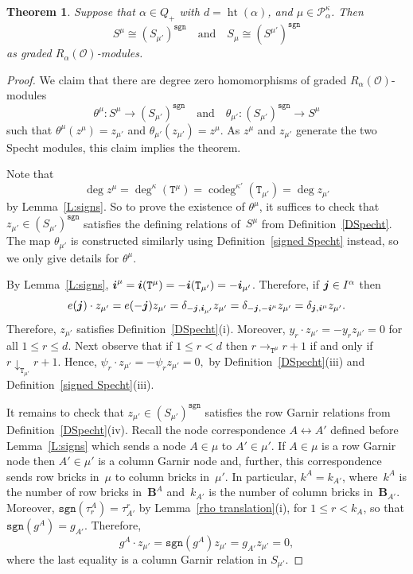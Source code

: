\documentclass[twoside,11pt,reqno]{amsart}
\numberwithin{equation}{section}
\newtheorem{Theorem}[equation]{Theorem}
\theoremstyle{definition}  %
\def\bi{\text{\boldmath$i$}}
\def\bj{\text{\boldmath$j$}}
\def\sgn{\mathtt{sgn}}
\newcommand{\0}{{\bar 0}}
\newcommand{\1}{{\bar 1}}
\newcommand{\al}{\alpha}
\def\Belt{\mathbf{B}}
\newcommand\Par[1][]{{\mathscr P}^{\kappa#1}}
\def\T{{\mathtt T}}
\def\codeg{\operatorname{codeg}}
\def\height{{\operatorname{ht}}}
\renewcommand\O{\mathcal O}
\begin{document}
\begin{Theorem}\label{TSignDualSpecht}
  Suppose that $\al\in Q_+$ with $d=\height(\al)$, and $\mu\in\Par_\alpha$. Then
  $$S^\mu\cong(S_{\mu'})^\sgn \quad\text{and}\quad S_\mu\cong(S^{\mu'})^\sgn$$ 
  as graded $R_\al(\O)$-modules.
\end{Theorem}

\begin{proof}
  We claim that there are degree zero homomorphisms  of graded  $R_\alpha(\O)$-modules
  $$ \theta^\mu:S^\mu\longrightarrow(S_{\mu'})^\sgn\quad\text{and}\quad
     \theta_{\mu'}:(S_{\mu'})^\sgn\longrightarrow S^\mu$$
  such that $\theta^\mu(z^\mu)=z_{\mu'}$ and $\theta_{\mu'}(z_{\mu'})=z^\mu$. As $z^\mu$
  and $z_{\mu'}$ generate the two Specht modules, this claim implies the theorem.  %
  
Note that  
$$\deg z^\mu=\deg^\kappa(\T^\mu)=\codeg^{\kappa'}(\T_{\mu'})=\deg z_{\mu'}$$ 
  by Lemma~\ref{L:signs}. 
 So to prove the existence of $\theta^\mu$, it suffices to check that $z_{\mu'}\in (S_{\mu'})^\sgn$ satisfies the defining relations of~$S^\mu$ from Definition~\ref{DSpecht}. The map $\theta_{\mu'}$ is constructed similarly using Definition~\ref{signed Specht} instead, so we only give details for $\theta^\mu$. 

  By Lemma~\ref{L:signs}, $\bi^\mu=\bi(\T^\mu)=-\bi(\T_{\mu'})=-\bi_{\mu'}$.  Therefore, if
  $\bj\in I^\al$ then
  $$e(\bj)\cdot z_{\mu'}=e(-\bj)z_{\mu'}=\delta_{-\bj,\bi_{\mu'}}z_{\mu'}=\delta_{-\bj,-\bi^{\mu}}z_{\mu'}=\delta_{\bj,\bi^\mu}z_{\mu'}.$$
  Therefore, $z_{\mu'}$ satisfies Definition~\ref{DSpecht}(i).
  Moreover, $y_r\cdot z_{\mu'}=-y_r z_{\mu'}=0$ for all $1\le r\le d$. Next observe that if
  $1\le r<d$ then $r\rightarrow_{\T^\mu}r+1$ if and only if $r\downarrow_{\T_{\mu'}}r+1$.
  Hence,
  $\psi_r\cdot z_{\mu'} =-\psi_rz_{\mu'}=0,$
  by Definition~\ref{DSpecht}(iii) and Definition~\ref{signed Specht}(iii). 

  It remains to check that $z_{\mu'}\in (S_{\mu'})^\sgn$ satisfies the row Garnir relations from Definition~\ref{DSpecht}(iv). Recall the node correspondence $A\leftrightarrow A'$
  defined before Lemma~\ref{L:signs} which sends a node $A\in\mu$ to $A'\in\mu'$.
  If $A\in\mu$ is a row Garnir node then $A'\in\mu'$ is a column
  Garnir node and, further, this correspondence sends row bricks in~$\mu$ to column
  bricks in~$\mu'$.  In particular, $k^A=k_{A'}$, where~$k^A$ is the number of row bricks
  in~$\Belt^A$ and~$k_{A'}$ is the number of column bricks in~$\Belt_{A'}$. Moreover,
  $\sgn(\tau_r^A)=\tau_{A'}^r$ by Lemma~\ref{rho translation}(i), for $1\le r<k_A$, 
  so that $\sgn(g^A)=g_{A'}$. Therefore,
  $$g^A\cdot z_{\mu'}=\sgn(g^A)z_{\mu'}=g_{A'}z_{\mu'}=0,$$ 
  where the last equality is a column Garnir relation in $S_{\mu'}$.
\end{proof}
\end{document}
